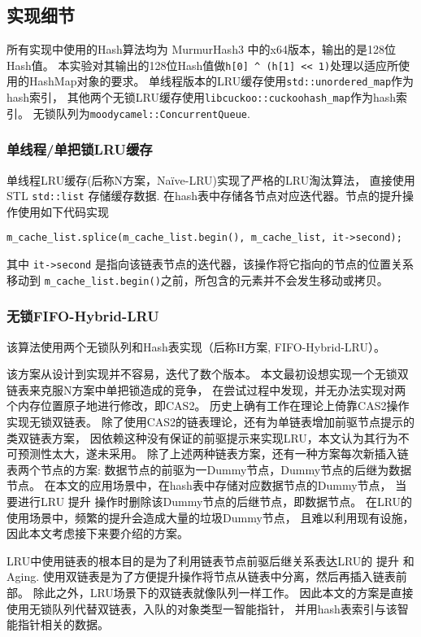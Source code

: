 \subsection{实现细节}

所有实现中使用的Hash算法均为 MurmurHash3\cite{smhasher} 中的x64版本，输出的是128位Hash值。
本实验对其输出的128位Hash值做\verb|h[0] ^ (h[1] << 1)|处理以适应所使用的HashMap对象的要求。
单线程版本的LRU缓存使用\verb|std::unordered_map|作为hash索引，
其他两个无锁LRU缓存使用\verb|libcuckoo::cuckoohash_map|\cite{libcuckoo}作为hash索引。
无锁队列为\verb|moodycamel::ConcurrentQueue|\cite{cameron_concurrentqueue}.

\subsubsection{单线程/单把锁LRU缓存}

单线程LRU缓存(后称N方案，Na\"{i}ve-LRU)实现了严格的LRU淘汰算法，
直接使用STL \verb|std::list| 存储缓存数据.
在hash表中存储各节点对应迭代器。节点的提升操作使用如下代码实现 
\begin{verbatim}
m_cache_list.splice(m_cache_list.begin(), m_cache_list, it->second);
\end{verbatim}
其中 \verb|it->second| 是指向该链表节点的迭代器，该操作将它指向的节点的位置关系移动到
\verb|m_cache_list.begin()|之前，所包含的元素并不会发生移动或拷贝。

\subsubsection{无锁FIFO-Hybrid-LRU}\label{sec:fifo-hybrid}

该算法使用两个无锁队列和Hash表实现（后称H方案, FIFO-Hybrid-LRU）。

该方案从设计到实现并不容易，迭代了数个版本。
本文最初设想实现一个无锁双链表来克服N方案中单把锁造成的竞争，
在尝试过程中发现，并无办法实现对两个内存位置原子地进行修改，即CAS2。
历史上确有工作在理论上倚靠CAS2操作实现无锁双链表。
除了使用CAS2的链表理论，还有为单链表增加前驱节点提示的类双链表方案，
因依赖这种没有保证的前驱提示来实现LRU，本文认为其行为不可预测性太大，遂未采用。
除了上述两种链表方案，还有一种方案每次新插入链表两个节点的方案:
数据节点的前驱为一Dummy节点，Dummy节点的后继为数据节点。
在本文的应用场景中，在hash表中存储对应数据节点的Dummy节点，
当要进行LRU 提升 操作时删除该Dummy节点的后继节点，即数据节点。
在LRU的使用场景中，频繁的提升会造成大量的垃圾Dummy节点，
且难以利用现有设施，因此本文考虑接下来要介绍的方案。

LRU中使用链表的根本目的是为了利用链表节点前驱后继关系表达LRU的 提升 和 Aging.
使用双链表是为了方便提升操作将节点从链表中分离，然后再插入链表前部。
除此之外，LRU场景下的双链表就像队列一样工作。
因此本文的方案是直接使用无锁队列代替双链表，入队的对象类型一智能指针，
并用hash表索引与该智能指针相关的数据。

